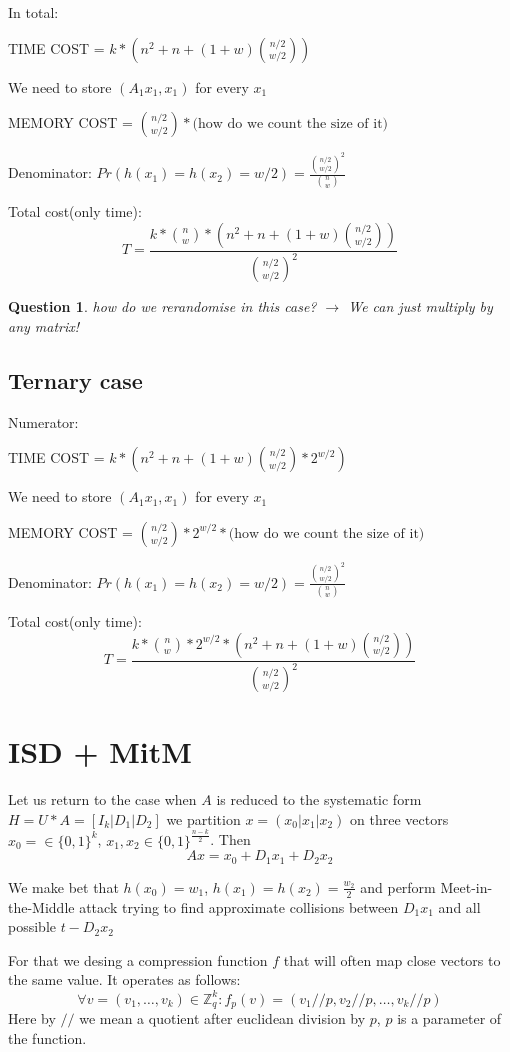 \documentclass[12pt]{article}
\newcommand{\ZZ}{\mathbb{Z}}
\newtheorem{question}{Question}
\begin{document}
In total:

TIME COST = $k*(n^2 + n + (1 + w)\binom{n/2}{w/2})$

We need to store $(A_1x_1, x_1)$ for every $x_1$

MEMORY COST = $\binom{n/2}{w/2} * \text{(how do we count the size of it)}$

Denominator:
$Pr(h(x_1) = h(x_2) = w/2) = \frac{\binom{n/2}{w/2}^{2}}{\binom{n}{w}}$

Total cost(only time):
\[
  T = \frac{k*\binom{n}{w}*(n^2 + n + (1 + w)\binom{n/2}{w/2})}{\binom{n/2}{w/2}^2}
\]

\begin{question}
  how do we rerandomise in this case? $\rightarrow$ We can just multiply by any matrix!
\end{question}

\subsection{Ternary case}
Numerator:

TIME COST = $k*(n^2 + n + (1 + w)\binom{n/2}{w/2}*2^{w/2})$

We need to store $(A_1x_1, x_1)$ for every $x_1$

MEMORY COST = $\binom{n/2}{w/2} * 2^{w/2} * \text{(how do we count the size of it)}$

Denominator:
$Pr(h(x_1) = h(x_2) = w/2) = \frac{\binom{n/2}{w/2}^{2}}{\binom{n}{w}}$

Total cost(only time):
\[
  T = \frac{k*\binom{n}{w}*2^{w/2}*(n^2 + n + (1 + w)\binom{n/2}{w/2})}{\binom{n/2}{w/2}^2}
\]
\section{ISD + MitM}
Let us return to the case when $A$ is reduced to the systematic form $H = U * A = [I_{k}| D_1 | D_2]$ we partition $x = (x_0 |x_1 |x_2)$ on three vectors $x_0 = \in \{0,1\}^{k}$, $x_1,x_2 \in \{0,1\}^{\frac{n-k}{2}}$. Then
\[
  Ax = x_0 + D_1x_1 + D_2x_2
\]

We make bet that $h(x_0) = w_1$, $h(x_1) = h(x_2) = \frac{w_2}{2}$ and perform Meet-in-the-Middle attack trying to find approximate collisions between $D_1x_1$ and all possible $t - D_2x_2$

For that we desing a compression function $f$ that will often map close vectors to the same value. It operates as follows:
\[
\forall v = (v_1, \dots , v_k)\in \ZZ_{q}^{k}: f_{p}(v) = (v_1 // p, v_2 // p, \dots, v_k // p)
\]
Here by $//$ we mean a quotient after euclidean division by $p$, $p$ is a parameter of the function.
\end{document}
